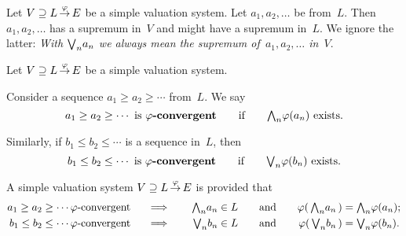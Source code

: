 \documentclass[main.tex]{subfiles}
\begin{document}
\begin{nt}
Let $V \supseteq L\,\smash{\stackrel{\varphi}{\rightarrow}}\,E$ be a simple valuation system.
Let $a_1, a_2, \dotsc$ be from~$L$.
Then $a_1, a_2,\dotsc$ has a supremum
in~$V$ and might have a supremum in~$L$.
We ignore the latter:
\emph{With $\textstyle{\bigvee}_n a_n$
we always mean the supremum of~$a_1, a_2,\dotsc $ in~$V$}.
\end{nt}
%
%
\begin{dfn}
Let $V \supseteq L\,\smash{\stackrel{\varphi}{\rightarrow}}\,E$ be a simple valuation system.

Consider a sequence
$a_1 \geq a_2 \geq \dotsb$ from~$L$.
We say
\begin{equation*}
a_1 \geq a_2 \geq \dotsb \text{ is \textbf{$\varphi$-convergent}}
\qquad\text{if}\qquad \textstyle{\bigwedge}_n \varphi(a_n)\text{ exists.}
\end{equation*}

Similarly,
if
$b_1 \leq b_2 \leq \dotsb$ is
a sequence in~$L$, then 
\begin{equation*}
b_1 \leq b_2 \leq \dotsb \text{ is \textbf{$\varphi$-convergent}}
\qquad\text{if}\qquad \textstyle{\bigvee}_n \varphi(b_n)\text{ exists.}
\end{equation*}
\end{dfn}
%
%
\begin{dfn}
\label{D:system-complete}
A simple valuation system 
$V \supseteq L\,\smash{\stackrel{\varphi}{\rightarrow}}\,E$ is  provided that
\begin{alignat*}{5}
a_1 \geq a_2 \geq \dotsb \text{$\varphi$-convergent }
  \quad &\implies \quad 
  & \textstyle{\bigwedge}_n a_n &\in L\quad 
  &&\text{and}\quad
  &\varphi(\,\textstyle{\bigwedge}_n a_n\,) &= \textstyle{\bigwedge}_n \varphi(a_n); \\
b_1 \leq b_2 \leq \dotsb \text{$\varphi$-convergent }
  \quad &\implies \quad 
  & \textstyle{\bigvee}_n b_n &\in L\quad 
  &&\text{and}\quad
  &\varphi(\,\textstyle{\bigvee}_n b_n\,) &= \textstyle{\bigvee}_n \varphi(b_n).
\end{alignat*}
\end{dfn}

\end{document}
